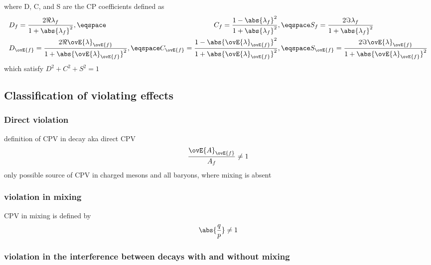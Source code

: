 %
where D, C, and S are the CP coefficients defined as
%
\begin{equation}
  \begin{alignedat}{2}
    &D_f = \frac{2 \Re \lambda_f}{1+\abs{\lambda_f}^2}, \eqspace 
    &C_f = \frac{1 - \abs{\lambda_f}^2}{1 + \abs{\lambda_f}^2}, \eqspace 
    &S_f = \frac{2 \Im \lambda_f}{1+\abs{\lambda_f}^2} \\
    &D_{\ovE{f}} = \frac{2 \Re \ovE{\lambda}_{\ovE{f}}}{1+\abs{\ovE{\lambda}_{\ovE{f}}}^2}, \eqspace 
    &C_{\ovE{f}} = \frac{1 - \abs{\ovE{\lambda}_{\ovE{f}}}^2}{1 + \abs{\ovE{\lambda}_{\ovE{f}}}^2}, \eqspace 
    &S_{\ovE{f}} = \frac{2 \Im \ovE{\lambda}_{\ovE{f}}}{1+\abs{\ovE{\lambda}_{\ovE{f}}}^2} \\
  \end{alignedat}
\end{equation}
%
which satisfy $D^2+C^2+S^2 = 1$

\subsection[Classification of \CP violating effects]{Classification of \CPbfsf violating effects}
\label{sec:cpv_theory:flavour_physics:cpv_classification}

\subsubsection[Direct \CP violation]{Direct \CPbfsf violation}
\label{sec:cpv_theory:flavour_physics:cpv_classification:direct}

definition of CPV in decay aka direct CPV
%
\begin{equation}
  \frac{\ovE{A}_{\ovE{f}}}{A_f} \neq 1
\end{equation}
%
only possible source of CPV in charged mesons and all baryons, where mixing is absent

\subsubsection[\CP violation in mixing]{\CPbfsf violation in mixing}
\label{sec:cpv_theory:flavour_physics:cpv_classification:mixing}

CPV in mixing is defined by
%
\begin{equation}
  \abs{\frac{q}{p}} \neq 1
\end{equation}

\subsubsection[\CP violation in the interference between decays with and without mixing]{\CPbfsf violation in the interference between decays with and without mixing}
\label{sec:cpv_theory:flavour_physics:cpv_classification:interference}

